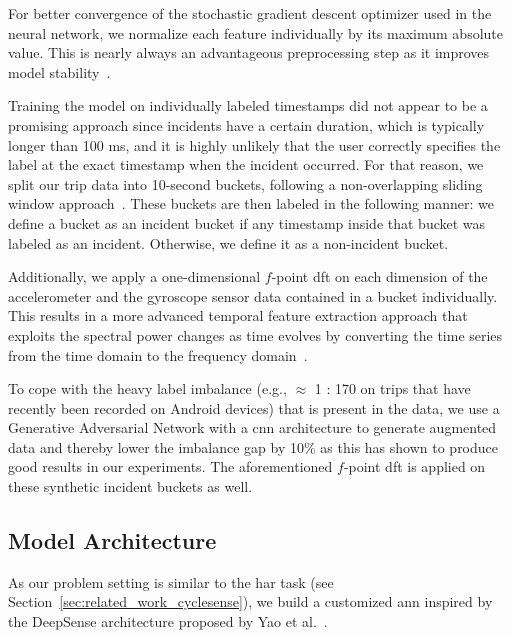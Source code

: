 For better convergence of the stochastic gradient descent optimizer used in the neural network, we normalize each feature individually by its maximum absolute value.
This is nearly always an advantageous preprocessing step as it improves model stability~\cite{bishop1995neural}.

Training the model on individually labeled timestamps did not appear to be a promising approach since incidents have a certain duration, which is typically longer than 100 ms, and it is highly unlikely that the user correctly specifies the label at the exact timestamp when the incident occurred.
For that reason, we split our trip data into 10-second buckets, following a non-overlapping sliding window approach~\cite{ortiz2011dynamic}.
These buckets are then labeled in the following manner: we define a bucket as an incident bucket if any timestamp inside that bucket was labeled as an incident.
Otherwise, we define it as a non-incident bucket.

Additionally, we apply a one-dimensional $f$-point \ac{dft} on each dimension of the accelerometer and the gyroscope sensor data contained in a bucket individually.
This results in a more advanced temporal feature extraction approach that exploits the spectral power changes as time evolves by converting the time series from the time domain to the frequency domain~\cite{chen2021deep}.


To cope with the heavy label imbalance (e.g., $\approx$ 1 : 170 on trips that have recently been recorded on Android devices) that is present in the data, we use a Generative Adversarial Network with a \ac{cnn} architecture to generate augmented data and thereby lower the imbalance gap by 10\% as this has shown to produce good results in our experiments.
The aforementioned $f$-point \ac{dft} is applied on these synthetic incident buckets as well.

\subsection{Model Architecture}
\label{subsec:model_architecture}
As our problem setting is similar to the \ac{har} task (see Section~\ref{sec:related_work_cyclesense}), we build a customized \ac{ann} inspired by the DeepSense architecture proposed by Yao et al.~\cite{yao2017deepsense}.

